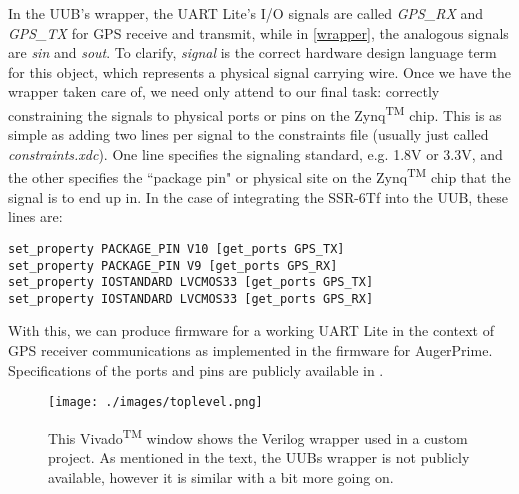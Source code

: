 In the UUB's wrapper, the UART Lite's I/O signals are called \textit{GPS\_RX} and \textit{GPS\_TX} for GPS receive and transmit, while in \autoref{wrapper}, the analogous signals are \textit{sin} and \textit{sout}. To clarify, \textit{signal} is the correct hardware design language term for this object, which represents a physical signal carrying wire. Once we have the wrapper taken care of, we need only attend to our final task: correctly constraining the signals to physical ports or pins on the Zynq\textsuperscript{TM} chip. This is as simple as adding two lines per signal to the constraints file (usually just called \textit{constraints.xdc}). One line specifies the signaling standard, e.g. 1.8V or 3.3V, and the other specifies the ``package pin" or physical site on the Zynq\textsuperscript{TM} chip that the signal is to end up in. In the case of integrating the SSR-6Tf into the UUB, these lines are:
\begin{verbatim}
set_property PACKAGE_PIN V10 [get_ports GPS_TX]
set_property PACKAGE_PIN V9 [get_ports GPS_RX]
set_property IOSTANDARD LVCMOS33 [get_ports GPS_TX]
set_property IOSTANDARD LVCMOS33 [get_ports GPS_RX]
\end{verbatim}
With this, we can produce firmware for a working UART Lite in the context of GPS receiver communications as implemented in the firmware for AugerPrime. Specifications of the ports and pins are publicly available in .%
\begin{figure}[H]
\centering
\texttt{[image: ./images/toplevel.png]}
\caption[Top Level Wrapper Example]{This Vivado\textsuperscript{TM} window shows the Verilog wrapper used in a custom project. As mentioned in the text, the UUBs wrapper is not publicly available, however it is similar with a bit more going on. }
\label{wrapper}
\end{figure}



